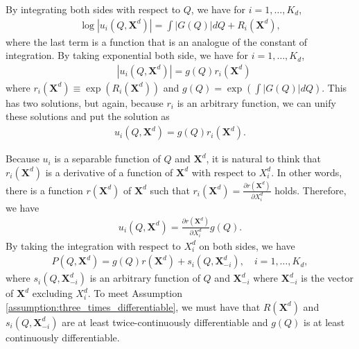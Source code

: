 \documentclass[11pt, a4paper]{article}
\begin{document}
By integrating both sides with respect to $Q$, we have for $i = 1, \ldots, K_d$,
\begin{align}
    \log |u_i(Q, \bm{X}^{d})| = \int |G(Q)| dQ + R_i(\bm{X}^{d}),
\end{align}
where the last term is a function that is an analogue of the constant of integration.
By taking exponential both side, we have for $i = 1, \ldots, K_d$,
\begin{align}
    & |u_i(Q, \bm{X}^{d})| = g(Q)r_i(\bm{X}^{d})
\end{align}
where $r_i(\bm{X}^{d}) \equiv \exp(R_i(\bm{X}^{d}))$ and $g(Q) = \exp\left(\int |G(Q)| dQ\right)$.
This has two solutions, but again, because $r_i$ is an arbitrary function, we can unify these solutions and put the solution as
\begin{align}
    u_i(Q, \bm{X}^{d}) = g(Q)r_i(\bm{X}^{d}).
\end{align}

Because $u_i$ is a separable function of $Q$ and $\bm{X}^{d}$, it is natural to think that $r_i(\bm{X}^{d})$ is a derivative of a function of $\bm{X}^{d}$ with respect to $X^{d}_i$.
In other words, there is a function $r(\bm{X}^{d})$ of $\bm{X}^{d}$ such that $r_i(\bm{X}^{d}) = \frac{\partial r(\bm{X}^{d})}{\partial X^{d}_i}$ holds.
Therefore, we have
\begin{align}
    u_i(Q, \bm{X}^{d}) = \frac{\partial r(\bm{X}^{d})}{\partial X^{d}_i} g(Q).
\end{align}
By taking the integration with respect to $X^{d}_i$ on both sides, we have
\begin{align}
   P(Q, \bm{X}^{d}) = g(Q) r(\bm{X}^{d}) + s_i(Q, \bm{X}^{d}_{-i}), \quad i = 1, \ldots, K_d, \label{eq:inverse_demand_separable_step1}
\end{align}
where $s_i(Q, \bm{X}^{d}_{-i})$ is an arbitrary function of $Q$ and $\bm{X}^{d}_{-i}$ where $\bm{X}^{d}_{-i}$ is the vector of $\bm{X}^{d}$ excluding $X^{d}_i$.
To meet Assumption \ref{assumption:three_times_differentiable}, we must have that $R(\bm{X}^{d})$ and $s_i(Q, \bm{X}^{d}_{-i})$ are at least twice-continuously differentiable and $g(Q)$ is at least continuously differentiable.
\end{document}
